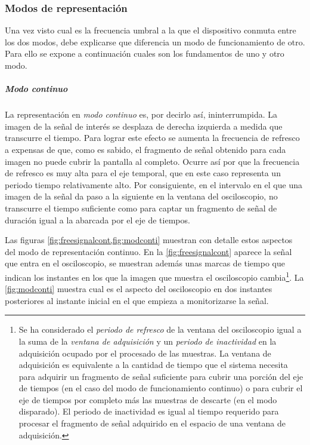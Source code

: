 \subsubsection{Modos de representación}

Una vez visto cual es la frecuencia umbral a la que el dispositivo conmuta entre los dos modos, debe explicarse que diferencia un modo de funcionamiento de otro. Para ello se expone a continuación cuales son los fundamentos de uno y otro modo.


\subparagraph{Modo continuo}

La representación en \emph{modo continuo} es, por decirlo así, ininterrumpida. La imagen de la señal de interés se desplaza de derecha izquierda a medida que transcurre el tiempo. Para lograr este efecto se aumenta la frecuencia de refresco a expensas de que, como es sabido, el fragmento de señal obtenido para cada imagen no puede cubrir la pantalla al completo. Ocurre así por que la frecuencia de refresco es muy alta para el eje temporal, que en este caso representa un periodo tiempo relativamente alto. Por consiguiente, en el intervalo en el que una imagen de la señal da paso a la siguiente en la ventana del osciloscopio, no transcurre el tiempo suficiente como para captar un fragmento de señal de duración igual a la abarcada por el eje de tiempos.\par
Las figuras \cref{fig:freesignalcont,fig:modconti} muestran con detalle estos aspectos del modo de representación continuo. En la \cref{fig:freesignalcont} aparece la señal que entra en el osciloscopio, se muestran además unas marcas de tiempo que indican los instantes en los que la imagen que muestra el osciloscopio cambia\footnote{Se ha considerado el \emph{periodo de refresco} de la ventana del osciloscopio igual a la suma de la \emph{ventana de adquisición} y un \emph{periodo de inactividad} en la adquisición ocupado por el procesado de las muestras. La ventana de adquisición es equivalente a la cantidad de tiempo que el sistema necesita para adquirir un fragmento de señal suficiente para cubrir una porción del eje de tiempos (en el caso del modo de funcionamiento continuo) o para cubrir el eje de tiempos por completo más las muestras de descarte (en el modo disparado). El periodo de inactividad es igual al tiempo requerido para procesar el fragmento de señal adquirido en el espacio de una ventana de adquisición.}. La \cref{fig:modconti} muestra cual es el aspecto del osciloscopio en dos instantes posteriores al instante inicial en el que empieza a monitorizarse la señal.

